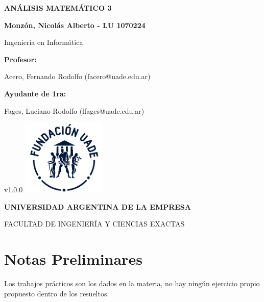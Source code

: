 \documentclass[a4paper, 12pt, oneside, titlepage, openany]{book}
\begin{document}

\begin{titlepage}

	\centering
	{\textbf{\fontsize{16}{17}\selectfont AN\'ALISIS MATEM\'ATICO 3} \par}
	\vspace{1cm}
	{\textbf{\fontsize{16}{17}\selectfont Monz\'on, Nicol\'as Alberto - LU 1070224} \par}
	\vspace{1.5cm}
	{\fontsize{16}{17}\selectfont Ingenier\'ia en Inform\'atica \par}
	\vspace{1cm}
	{\textbf{\fontsize{14}{14}\selectfont Profesor:} \par}
	{\fontsize{14}{14}\selectfont Acero, Fernando Rodolfo (facero@uade.edu.ar)
	\par}
	\vspace{1cm}
	{\textbf{\fontsize{14}{14}\selectfont Ayudante de 1ra:} \par}
	{\fontsize{14}{14}\selectfont Fages, Luciano Rodolfo (lfages@uade.edu.ar)
	\par}
	\vfill
		v1.0.0
	\vfill
	\includegraphics[width=0.30\textwidth]{./images/UADE}\par \vspace{1cm}
	{\textbf{\fontsize{14}{14}\selectfont UNIVERSIDAD ARGENTINA DE LA EMPRESA} \par}
	{\fontsize{14}{14}\selectfont FACULTAD DE INGENIER\'IA Y CIENCIAS EXACTAS \par}

\end{titlepage}

\chapter*{Notas Preliminares}
Los trabajos pr\'acticos son los dados en la materia, no hay ning\'un ejercicio propio propuesto dentro de los resueltos.
\end{document}
